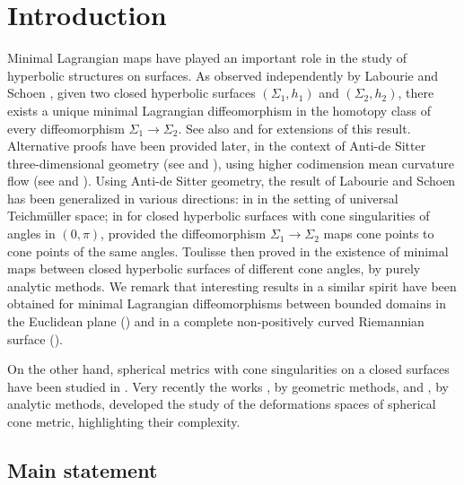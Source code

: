 \documentclass[11pt]{article}
\theoremstyle{definition}
\begin{document}
\section{Introduction}

Minimal Lagrangian maps have played an important role in the study of hyperbolic structures on surfaces. As observed independently by Labourie \cite{labourieCP} and Schoen \cite{Schoenharmonic}, given two closed hyperbolic surfaces $(\Sigma_1,h_1)$ and $(\Sigma_2,h_2)$, there exists a unique minimal Lagrangian diffeomorphism in the homotopy class of every diffeomorphism $\Sigma_1\to\Sigma_2$. See also \cite{zbMATH00827487} and \cite{zbMATH00870993,graham} for extensions of this result. Alternative proofs have been provided later, in the context of Anti-de Sitter three-dimensional geometry (see \cite{foliationCMC} and \cite[\S 7]{survey}), using higher codimension mean curvature flow (see \cite{zbMATH01744223} and \cite{zbMATH05996706}). Using Anti-de Sitter geometry, the result of Labourie and Schoen has been generalized in various directions: in \cite{bon_schl,zbMATH06902491} in the setting of universal Teichmüller space; in \cite{zbMATH06680278} for closed hyperbolic surfaces with cone singularities of angles in $(0,\pi)$, provided the diffeomorphism $\Sigma_1\to\Sigma_2$ maps cone points to cone points of the same angles. Toulisse then proved in \cite{zbMATH07149810} the existence of minimal maps between closed hyperbolic surfaces of different cone angles, by purely analytic methods. We remark that interesting results in a similar spirit have been obtained for minimal Lagrangian diffeomorphisms between bounded domains in the Euclidean plane (\cite{zbMATH00032290,zbMATH01145655}) and in a complete non-positively curved Riemannian surface (\cite{zbMATH05346543}).

On the other hand, spherical metrics with cone singularities on a closed surfaces have been studied in \cite{zbMATH03988171,zbMATH04073390,zbMATH04142953,zbMATH04194621,zbMATH00126050}. Very recently the works \cite{zbMATH06992339,zbMATH07091755,mondpanov2}, by geometric methods, and \cite{zbMATH06741332,zbMATH07197533,mazzeozhu2}, by analytic methods, developed the study of the deformations spaces of spherical cone metric, highlighting their complexity.

\subsection{Main statement}
\end{document}
